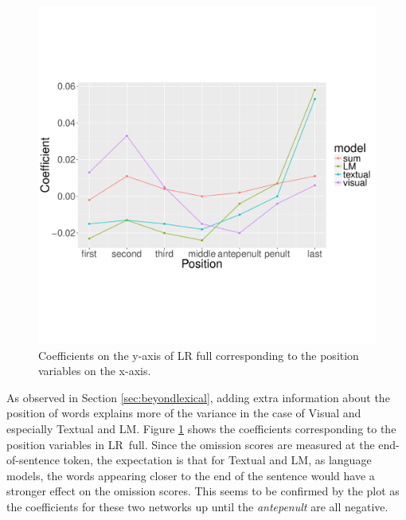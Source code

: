 \begin{figure}
\centering
 \includegraphics[scale=0.4]{chapters/COLI/position-coef.pdf}
 \vspace{-2cm}
 \caption{Coefficients on the y-axis of {\sc LR full} corresponding to the
position variables on the x-axis.}
 \label{fig:posrqs}
\end{figure}

As observed in Section \ref{sec:beyondlexical},
adding extra information about the position of words
explains more of the variance in the case of {\sc Visual} and especially
{\sc Textual} and {\sc LM}.
Figure \ref{fig:posrqs} shows the coefficients corresponding to the
position variables in {\sc LR~full}. Since the omission scores
are measured at the end-of-sentence token, the expectation is that
for {\sc Textual} and {\sc LM}, as language models,
the words appearing closer to the end of the sentence would have a
stronger effect on the omission scores. This seems to be confirmed by
the plot as the coefficients for these two networks up until the
\emph{antepenult} are all negative.


